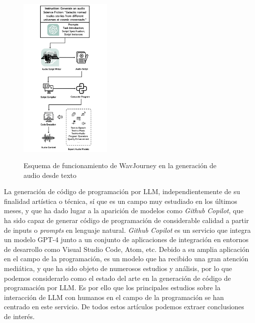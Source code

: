 \begin{figure}[H]
    \caption[Esquema de funcionamiento de WavJourney]{Esquema de funcionamiento de WavJourney en la generación de audio desde texto}
    \centering
    \includegraphics[width=0.4\textwidth]{./figuras/WavJourney.png}
    \label{fig:wavjourney}
\end{figure}


La generación de código de programación por LLM, independientemente de su finalidad artística o técnica, sí que es un campo muy estudiado en los últimos meses, y que ha dado lugar a la aparición de modelos como \textit{Github Copilot}, que ha sido capaz de generar código de programación de considerable calidad a partir de inputs o \textit{prompts} en lenguaje natural. \textit{Github Copilot} es un servicio que integra un modelo GPT-4 junto a un conjunto de aplicaciones de integración en entornos de desarrollo como Visual Studio Code, Atom, etc. Debido a su amplia aplicación en el campo de la programación, es un modelo que ha recibido una gran atención mediática, y que ha sido objeto de numerosos estudios y análisis, por lo que podemos considerarlo como el estado del arte en la generación de código de programación por LLM. Es por ello que los principales estudios sobre la interacción de LLM con humanos en el campo de la programación se han centrado en este servicio. De todos estos artículos podemos extraer conclusiones de interés.

